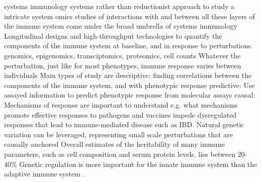 \begin{outline}
\1 systems immunology systems rather than reductionist approach to study a intricate system
\1 omics studies of interactions with and between all these layers of the immune system come under the broad umbrella of systems immunology
    \2 Longitudinal designs and high-throughput technologies to quantify the components of the immune system at baseline, and in response to perturbations.
        \3 genomics, epigenomics, transciptomics, proteomics, cell counts
    \2 Whatever the perturbation, just like for most phenotypes, immune response varies between individuals
    \2 Main types of study are descriptive:
        \3 finding correlations between the components of the immune system, and with phenotypic response
    \2 predictive:
        \3 Use assayed information to predict phenotypic response from molecular assays
    \2 causal:
        \3 Mechanisms of response are important to understand e.g. 
            \4 what mechanisms promote effective responses to pathogens and vaccines
            \4 impede dysregulated responses that lead to immune-mediated disease such as IBD.
    \2 Natural genetic variation can be leveraged, representing small scale perturbations that are causally anchored \autocite{tsang2015UtilizingPopulationVariation,villani2018SystemsImmunologyLearning}
        \3 Overall estimates of the heritability of many immune parameters, such as cell composition and serum protein levels, lies between 20-40\% \autocite{liston2016ShapingVariationHuman,brodin2017HumanImmuneSystem,patin2018NaturalVariationParameters,liston2018OriginsDiversityHuman}
        \3 Genetic regulation is more important for the innate immune system than the adaptive immune system \autocite{patin2018NaturalVariationParameters}.


\end{outline}
